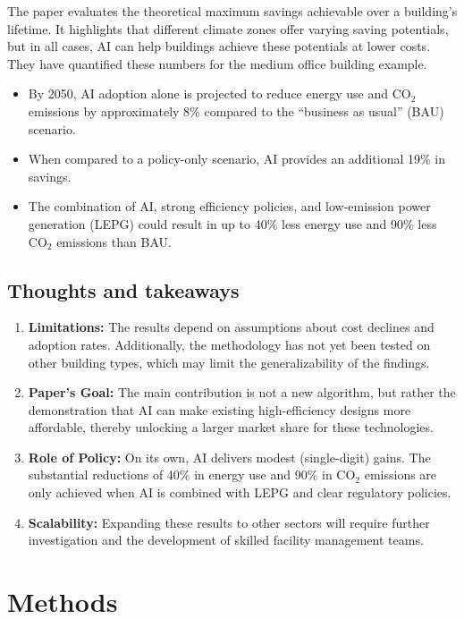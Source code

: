 \documentclass[conference,a4paper]{IEEEtran}
\begin{document}
The paper evaluates the theoretical maximum savings achievable over a building’s lifetime. It highlights that different climate zones offer varying saving potentials, but in all cases, AI can help buildings achieve these potentials at lower costs. They have quantified these numbers for the medium office building example.
\begin{itemize}
    \item By 2050, AI adoption alone is projected to reduce energy use and CO$_2$ emissions by approximately 8\% compared to the “business as usual” (BAU) scenario.
    \item When compared to a policy-only scenario, AI provides an additional 19\% in savings.
    \item The combination of AI, strong efficiency policies, and low-emission power generation (LEPG) could result in up to 40\% less energy use and 90\% less CO$_2$ emissions than BAU.
\end{itemize}

\subsection*{Thoughts and takeaways}
\begin{enumerate}
    \item \textbf{Limitations:} The results depend on assumptions about cost declines and adoption rates. Additionally, the methodology has not yet been tested on other building types, which may limit the generalizability of the findings.
    \item \textbf{Paper’s Goal:} The main contribution is not a new algorithm, but rather the demonstration that AI can make existing high-efficiency designs more affordable, thereby unlocking a larger market share for these technologies.
    \item \textbf{Role of Policy:} On its own, AI delivers modest (single-digit) gains. The substantial reductions of 40\% in energy use and 90\% in CO$_2$ emissions are only achieved when AI is combined with LEPG and clear regulatory policies.
    \item \textbf{Scalability:} Expanding these results to other sectors will require further investigation and the development of skilled facility management teams.
\end{enumerate}

\section*{Methods}
\end{document}
